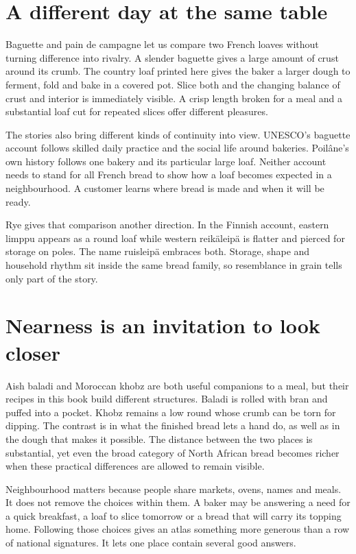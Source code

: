 \section{A different day at the same table}
Baguette and pain de campagne let us compare two French loaves without turning difference into rivalry. A slender baguette gives a large amount of crust around its crumb. The country loaf printed here gives the baker a larger dough to ferment, fold and bake in a covered pot. Slice both and the changing balance of crust and interior is immediately visible. A crisp length broken for a meal and a substantial loaf cut for repeated slices offer different pleasures.

The stories also bring different kinds of continuity into view. UNESCO's baguette account follows skilled daily practice and the social life around bakeries. Poilâne's own history follows one bakery and its particular large loaf. Neither account needs to stand for all French bread to show how a loaf becomes expected in a neighbourhood. A customer learns where bread is made and when it will be ready.\citep{baguette,poilanestory,poilanemiche}

Rye gives that comparison another direction. In the Finnish account, eastern limppu appears as a round loaf while western reikäleipä is flatter and pierced for storage on poles. The name ruisleipä embraces both. Storage, shape and household rhythm sit inside the same bread family, so resemblance in grain tells only part of the story.\citep{finroot}

\section{Nearness is an invitation to look closer}
Aish baladi and Moroccan khobz are both useful companions to a meal, but their recipes in this book build different structures. Baladi is rolled with bran and puffed into a pocket. Khobz remains a low round whose crumb can be torn for dipping. The contrast is in what the finished bread lets a hand do, as well as in the dough that makes it possible. The distance between the two places is substantial, yet even the broad category of North African bread becomes richer when these practical differences are allowed to remain visible.\citep{saveurbaladi,benkhobz}

Neighbourhood matters because people share markets, ovens, names and meals. It does not remove the choices within them. A baker may be answering a need for a quick breakfast, a loaf to slice tomorrow or a bread that will carry its topping home. Following those choices gives an atlas something more generous than a row of national signatures. It lets one place contain several good answers.

